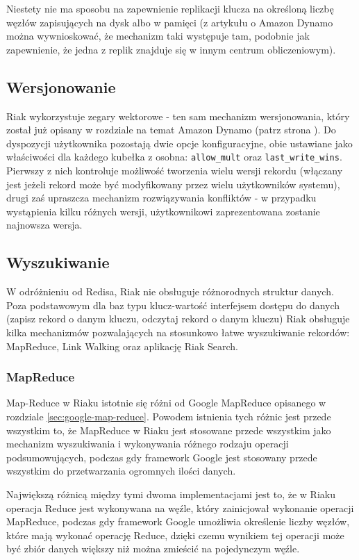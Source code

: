 Niestety nie ma sposobu na zapewnienie replikacji klucza na określoną liczbę węzłów zapisujących na dysk albo w pamięci (z artykułu o Amazon Dynamo można wywnioskować, że mechanizm taki występuje tam, podobnie jak zapewnienie, że jedna z replik znajduje się w innym centrum obliczeniowym).

\subsection*{Wersjonowanie}

Riak wykorzystuje zegary wektorowe - ten sam mechanizm wersjonowania, który został już opisany w rozdziale na temat Amazon Dynamo (patrz strona \pageref{sec:dynamo-vector-clocks}).
Do dyspozycji użytkownika pozostają dwie opcje konfiguracyjne, obie ustawiane jako właściwości dla każdego kubełka z osobna: \verb+allow_mult+ oraz \verb+last_write_wins+.
Pierwszy z nich kontroluje możliwość tworzenia wielu wersji rekordu (włączany jest jeżeli rekord może być modyfikowany przez wielu użytkowników systemu), drugi zaś upraszcza mechanizm rozwiązywania konfliktów - w przypadku wystąpienia kilku różnych wersji, użytkownikowi zaprezentowana zostanie najnowsza wersja.

\subsection*{Wyszukiwanie}

W odróżnieniu od Redisa, Riak nie obsługuje różnorodnych struktur danych.
Poza podstawowym dla baz typu klucz-wartość interfejsem dostępu do danych (zapisz rekord o danym kluczu, odczytaj rekord o danym kluczu) Riak obsługuje kilka mechanizmów pozwalających na stosunkowo łatwe wyszukiwanie rekordów: MapReduce, Link Walking oraz aplikację Riak Search.

\subsubsection*{MapReduce}

Map-Reduce w Riaku istotnie się różni od Google MapReduce opisanego w rozdziale \ref{sec:google-map-reduce}.
Powodem istnienia tych różnic jest przede wszystkim to, że MapReduce w Riaku jest stosowane przede wszystkim jako mechanizm wyszukiwania i wykonywania różnego rodzaju operacji podsumowujących, podczas gdy framework Google jest stosowany przede wszystkim do przetwarzania ogromnych ilości danych.

Największą różnicą między tymi dwoma implementacjami jest to, że w Riaku operacja Reduce jest wykonywana na węźle, który zainicjował wykonanie operacji MapReduce, podczas gdy framework Google umożliwia określenie liczby węzłów, które mają wykonać operację Reduce, dzięki czemu wynikiem tej operacji może być zbiór danych większy niż można zmieścić na pojedynczym węźle.

